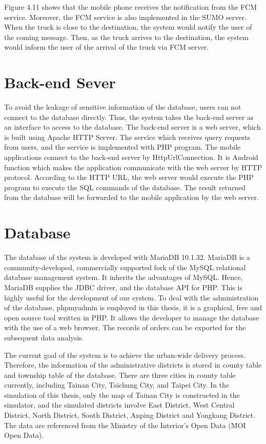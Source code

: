 \documentclass[12pt]{ksthesis}
\begin{document}
\begin{thesis}
{Figure 4.11 shows that the mobile phone receives the notification from the FCM service. Moreover, the FCM service is also implemented in the SUMO server. 
When the truck is close to the destination, the system would notify the user of the coming message. Then, as the truck arrives to the destination, the system would inform the user of the arrival of the truck via FCM server.



\section{Back-end Sever}
To avoid the leakage of sensitive information of the database, users can not connect to the database directly. Thus, the system takes the back-end server as an interface to access to the database. The back-end server is a web server, which is built using Apache HTTP Server. The service which receives query requests from users, and the service is implemented with PHP program. 
The mobile applications connect to the back-end server by HttpUrlConnection. It is Android function which makes the application communicate with the web server by HTTP protocol. According to the HTTP URL, the web server would execute the PHP program to execute the SQL commands of the database. The result returned from the database will be forwarded to the mobile application by the web server. 


\section{Database}
The database of the system is developed with MariaDB 10.1.32. MariaDB is a community-developed, commercially supported fork of the MySQL relational database management system. It inherits the advantages of MySQL. Hence, MariaDB supplies the JDBC driver, and the database API for PHP. This is highly useful for the development of our system. To deal with the administration of the database, phpmyadmin is employed in this thesis, it is a graphical, free and open source tool written in PHP. It allows the developer to manage the database with the use of a web browser. The records of orders can be exported for the subsequent data analysis.

The current goal of the system is to achieve the urban-wide delivery process. Therefore, the information of the administrative districts is stored in county table and township table of the database. There are three cities in county table currently, including Tainan City, Taichung City, and Taipei City. In the simulation of this thesis, only the map of Tainan City is constructed in the simulator, and the simulated districts involve East District, West Central District, North District, South District, Anping District and Yongkang District. The data are referenced from the Ministry of the Interior’s Open Data (MOI Open Data).








}
\end{thesis}
\end{document}
